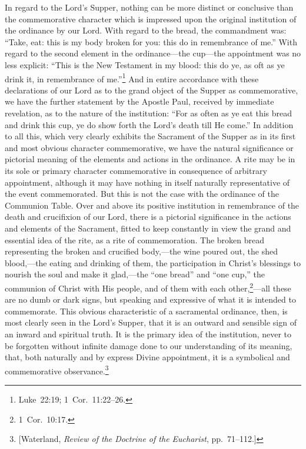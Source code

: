 \documentclass[
]{book}
\begin{document}
In regard to the Lord's Supper, nothing can be more distinct or conclusive than the commemorative character which is impressed upon the original institution of the ordinance by our Lord. With regard to the bread, the commandment was: ``Take, eat: this is my body broken for you: this do in remembrance of me.'' With regard to the second element in the ordinance---the cup---the appointment was no less explicit: ``This is the New Testament in my blood: this do ye, as oft as ye drink it, in remembrance of me.''\footnote{Luke~22:19; 1~Cor.~11:22--26.} And in entire accordance with these declarations of our Lord as to the grand object of the Supper as commemorative, we have the further statement by the Apostle Paul, received by immediate revelation, as to the nature of the institution: ``For as often as ye eat this bread and drink this cup, ye do show forth the Lord's death till He come.'' In addition to all this, which very clearly exhibits the Sacrament of the Supper as in its first and most obvious character commemorative, we have the natural significance or pictorial meaning of the elements and actions in the ordinance. A rite may be in its sole or primary character commemorative in consequence of arbitrary appointment, although it may have nothing in itself naturally representative of the event commemorated. But this is not the case with the ordinance of the Communion Table. Over and above its positive institution in remembrance of the death and crucifixion of our Lord, there is a pictorial significance in the actions and elements of the Sacrament, fitted to keep constantly in view the grand and essential idea of the rite, as a rite of commemoration. The broken bread representing the broken and crucified body,---the wine poured out, the shed blood,---the eating and drinking of them, the participation in Christ's blessings to nourish the soul and make it glad,---the ``one bread'' and ``one cup,'' the communion of Christ with His people, and of them with each other,\footnote{1~Cor.~10:17.}---all these are no dumb or dark signs, but speaking and expressive of what it is intended to commemorate. This obvious characteristic of a sacramental ordinance, then, is most clearly seen in the Lord's Supper, that it is an outward and sensible sign of an inward and spiritual truth. It is the primary idea of the institution, never to be forgotten without infinite damage done to our understanding of its meaning, that, both naturally and by express Divine appointment, it is a symbolical and commemorative observance.\footnote{{[}Waterland, \emph{Review of the Doctrine of the Eucharist}, pp.~71--112.{]}}
\end{document}
